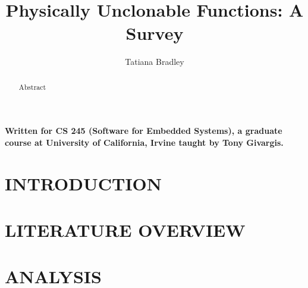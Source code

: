 \documentclass[letterpaper, 10 pt, conference]{ieeeconf}  %
\title{\LARGE \bf
Physically Unclonable Functions: A Survey
}
\author{Tatiana Bradley%
}
\begin{document}
\maketitle
\thispagestyle{empty}
\pagestyle{empty}


\noindent \textbf{Written for CS 245 (Software for Embedded Systems), a graduate course at University of California, Irvine taught by Tony Givargis. \\}


\begin{abstract}

Abstract

\end{abstract}


\section{INTRODUCTION}

\section{LITERATURE OVERVIEW}

\section{ANALYSIS}




\nocite{*}

\end{document}
